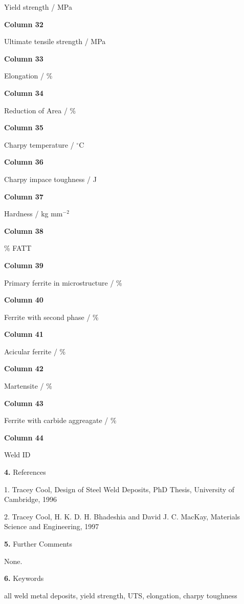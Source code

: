 \item{} \indent Yield strength / MPa
\medskip
\item{} {\bf Column 32}
\item{} \indent Ultimate tensile strength / MPa
\medskip
\item{} {\bf Column 33} 
\item{} \indent Elongation / \%
\medskip
\item{} {\bf Column 34} 
\item{} \indent Reduction of Area / \%
\medskip
\item{} {\bf Column 35} 
\item{} \indent  Charpy temperature / $^{\circ}$C
\medskip
\item{} {\bf Column 36} 
\item{} \indent Charpy impace toughness / J
\medskip
\item{} {\bf Column 37} 
\item{} \indent Hardness / kg mm$^{-2}$
\medskip
\item{} {\bf Column 38} 
\item{}  \% FATT
\medskip
\item{} {\bf Column 39} 
\item{} \indent Primary ferrite in microstructure / \%
\medskip
\item{} {\bf Column 40} 
\item{} \indent Ferrite with second phase / \%
\medskip
\item{} {\bf Column 41} 
\item{} \indent  Acicular ferrite / \%
\medskip
\item{} {\bf Column 42} 
\item{} \indent Martensite / \%
\medskip
\item{} {\bf Column 43} 
\item{} \indent Ferrite with carbide aggreagate / \%
\medskip
\item{} {\bf Column 44} 
\item{} \indent  Weld ID
\item {\bf 4.} {\largeb  References}
\bigskip
\item {} 1. Tracey Cool, Design of Steel Weld Deposits, PhD Thesis, University of Cambridge, 1996
\medskip
\item {} 2. Tracey Cool, H. K. D. H. Bhadeshia and David J. C. MacKay, Materials Science and Engineering, 1997
\bigskip
\item {\bf 5.} {\largeb  Further Comments}
\bigskip
\item {} None.
\bigskip
\item {\bf 6.} {\largeb  Keywords}
\bigskip
\item {} all weld metal deposits, yield strength, UTS, elongation, charpy toughness
\bye
